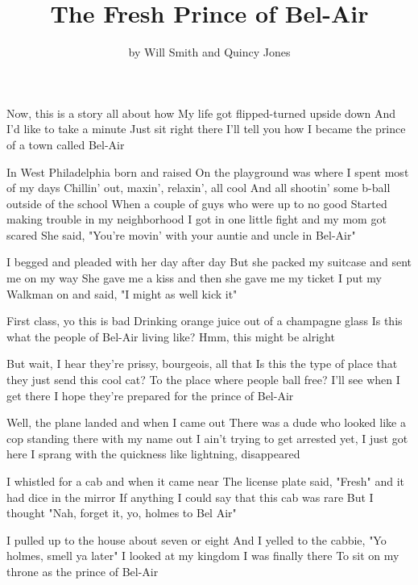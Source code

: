 \documentclass{article}
\title{The Fresh Prince of Bel-Air}
\author{by Will Smith and Quincy Jones}
\begin{document}
\maketitle

Now, this is a story all about how
My life got flipped-turned upside down
And I'd like to take a minute
Just sit right there
I'll tell you how I became the prince of a town called Bel-Air

In West Philadelphia born and raised
On the playground was where I spent most of my days
Chillin' out, maxin', relaxin', all cool
And all shootin' some b-ball outside of the school
When a couple of guys who were up to no good
Started making trouble in my neighborhood
I got in one little fight and my mom got scared
She said, "You're movin' with your auntie and uncle in Bel-Air"

I begged and pleaded with her day after day
But she packed my suitcase and sent me on my way
She gave me a kiss and then she gave me my ticket
I put my Walkman on and said, "I might as well kick it"

First class, yo this is bad
Drinking orange juice out of a champagne glass
Is this what the people of Bel-Air living like?
Hmm, this might be alright

But wait, I hear they're prissy, bourgeois, all that
Is this the type of place that they just send this cool cat?
To the place where people ball free?
I'll see when I get there
I hope they're prepared for the prince of Bel-Air

Well, the plane landed and when I came out
There was a dude who looked like a cop standing there with my name out
I ain't trying to get arrested yet, I just got here
I sprang with the quickness like lightning, disappeared

I whistled for a cab and when it came near
The license plate said, "Fresh" and it had dice in the mirror
If anything I could say that this cab was rare
But I thought "Nah, forget it, yo, holmes to Bel Air"

I pulled up to the house about seven or eight
And I yelled to the cabbie, "Yo holmes, smell ya later"
I looked at my kingdom
I was finally there
To sit on my throne as the prince of Bel-Air
\end{document}
